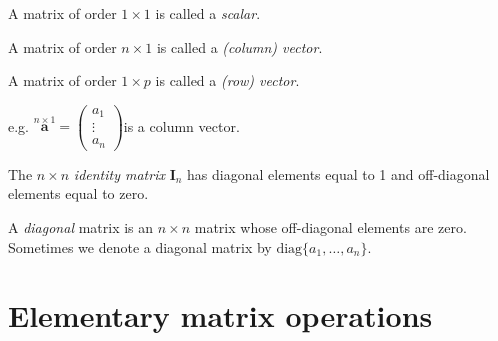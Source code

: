 \documentclass[]{book}
\theoremstyle{definition}
\theoremstyle{definition}
\theoremstyle{definition}
\theoremstyle{remark}
\begin{document}
A matrix of order \(1\times 1\) is called a \emph{scalar}.

A matrix of order \(n\times 1\) is called a \emph{(column) vector}.

A matrix of order \(1\times p\) is called a \emph{(row) vector}.

e.g. \(\stackrel{n\times 1}{\mathbf a}=\left( \begin{array}{c} a_1\\\vdots\\a_n \end{array} \right)\)\quad is a column vector.

The \(n\times n\) \emph{identity matrix} \({\mathbf I}_n\) has diagonal elements equal to 1
and off-diagonal elements equal to zero.

A \emph{diagonal} matrix is an \(n \times n\) matrix whose
off-diagonal elements are zero. Sometimes we denote a diagonal
matrix by \(\text{diag}\{a_1,\ldots, a_n\}\).

\hypertarget{elementary-matrix-operations}{%
\section{Elementary matrix operations}\label{elementary-matrix-operations}}
\end{document}
